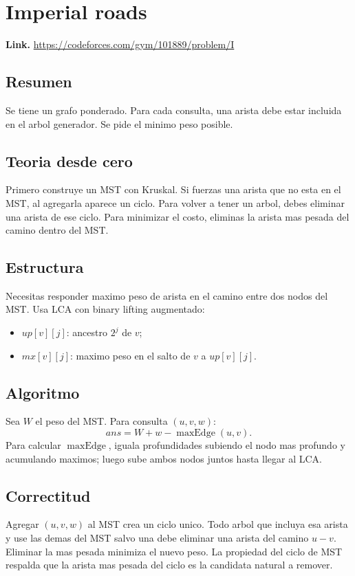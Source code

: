 \documentclass[10pt]{article}
\begin{document}
\clearpage
\section{Imperial roads}
\textbf{Link.} \url{https://codeforces.com/gym/101889/problem/I}

\subsection*{Resumen}
Se tiene un grafo ponderado. Para cada consulta, una arista debe estar incluida
en el arbol generador. Se pide el minimo peso posible.

\subsection*{Teoria desde cero}
Primero construye un MST con Kruskal. Si fuerzas una arista que no esta en el
MST, al agregarla aparece un ciclo. Para volver a tener un arbol, debes eliminar
una arista de ese ciclo. Para minimizar el costo, eliminas la arista mas pesada
del camino dentro del MST.

\subsection*{Estructura}
Necesitas responder maximo peso de arista en el camino entre dos nodos del MST.
Usa LCA con binary lifting augmentado:
\begin{itemize}[leftmargin=*]
\item $up[v][j]$: ancestro $2^j$ de $v$;
\item $mx[v][j]$: maximo peso en el salto de $v$ a $up[v][j]$.
\end{itemize}

\subsection*{Algoritmo}
Sea $W$ el peso del MST. Para consulta $(u,v,w)$:
\[
ans = W + w - \operatorname{maxEdge}(u,v).
\]
Para calcular $\operatorname{maxEdge}$, iguala profundidades subiendo el nodo
mas profundo y acumulando maximos; luego sube ambos nodos juntos hasta llegar al
LCA.

\subsection*{Correctitud}
Agregar $(u,v,w)$ al MST crea un ciclo unico. Todo arbol que incluya esa arista
y use las demas del MST salvo una debe eliminar una arista del camino $u-v$.
Eliminar la mas pesada minimiza el nuevo peso. La propiedad del ciclo de MST
respalda que la arista mas pesada del ciclo es la candidata natural a remover.
\end{document}
